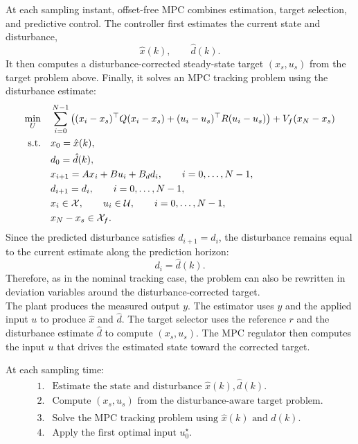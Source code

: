 At each sampling instant, offset-free MPC combines estimation, target selection, and predictive
control. The controller first estimates the current state and disturbance,
\[
    \hat x(k),\qquad \hat d(k).
\]
It then computes a disturbance-corrected steady-state target \((x_s,u_s)\) from the target
problem above. Finally, it solves an MPC tracking problem using the disturbance estimate:
\[
\begin{aligned}
    \min_U \quad &
    \sum_{i=0}^{N-1}
    \left(
        (x_i-x_s)^\top Q(x_i-x_s)
        +
        (u_i-u_s)^\top R(u_i-u_s)
    \right)
    +
    V_f(x_N-x_s)\\
    \text{s.t.}\quad
    & x_0=\hat x(k),\\
    & d_0=\hat d(k),\\
    & x_{i+1}=Ax_i+Bu_i+B_d d_i,\qquad i=0,\dots,N-1,\\
    & d_{i+1}=d_i,\qquad i=0,\dots,N-1,\\
    & x_i\in\mathcal{X},\qquad u_i\in\mathcal{U},\qquad i=0,\dots,N-1,\\
    & x_N-x_s\in\mathcal{X}_f.
\end{aligned}
\]
Since the predicted disturbance satisfies \(d_{i+1}=d_i\), the disturbance remains equal to the
current estimate along the prediction horizon:
\[
    d_i=\hat d(k).
\]
Therefore, as in the nominal tracking case, the problem can also be rewritten in deviation
variables around the disturbance-corrected target.\\
The plant produces the measured output \(y\). The estimator uses \(y\) and the applied input \(u\) to
produce \(\hat x\) and \(\hat d\). The target selector uses the reference \(r\) and the disturbance
estimate \(\hat d\) to compute \((x_s,u_s)\). The MPC regulator then computes the input \(u\)
that drives the estimated state toward the corrected target.

\begin{theorembox}
At each sampling time:
\[
\begin{array}{ll}
\text{1.} & \text{Estimate the state and disturbance } \hat x(k),\hat d(k).\\[2mm]
\text{2.} & \text{Compute } (x_s,u_s) \text{ from the disturbance-aware target problem.}\\[2mm]
\text{3.} & \text{Solve the MPC tracking problem using } \hat x(k) \text{ and } \hat d(k).\\[2mm]
\text{4.} & \text{Apply the first optimal input } u_0^\star.
\end{array}
\]
\end{theorembox}

